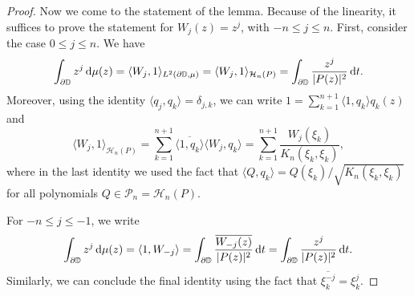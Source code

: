 \documentclass[10pt,a4paper]{amsart}
\def\P{\mathcal{P}}
\renewcommand{\d}{\text{\rm d}}
\newcommand{\dD}{\partial\mathbb{D}}
\begin{document}
\begin{proof}
Now we come to the statement of the lemma. Because of the linearity, it suffices to prove the statement for $W_j(z)=z^j$, with $-n\leq j\leq n$.  First, consider the case $0\leq j\leq n$. We have 
\begin{equation*}
    \int_{\dD} z^j\, \d\mu(z)=\langle W_j, 1\rangle_{L^2(\dD, \mu)}=\langle W_j, 1\rangle_{\mathcal{H}_n(P)}=\int_{\dD}\frac{z^j}{|P(z)|^2}\, \d t.
\end{equation*}
Moreover, using the identity $\langle q_j, q_k\rangle=\delta_{j,k}$, we can write $1=\sum_{k=1}^{n+1} \langle 1, q_k\rangle q_k(z)$ and 
\begin{equation*}
    \langle W_j, 1\rangle_{\mathcal{H}_n(P)}=\sum_{k=1}^{n+1}\overline{\langle 1, q_k\rangle}\langle W_j, q_k\rangle=\sum_{k=1}^{n+1}\frac{W_j(\xi_k)}{K_n(\xi_k, \xi_k)},
\end{equation*}
where in the last identity we used the fact that $\langle Q, q_k\rangle=Q(\xi_k)/\sqrt{K_n(\xi_k, \xi_k)}$ for all polynomials $Q\in \P_n=\mathcal{H}_n(P)$.

For $-n\leq j\leq -1$, we write
\begin{equation*}
    \int_{\dD} z^j\, \d\mu(z)=\langle 1, W_{-j}\rangle=\int_{\dD} \frac{\overline{W_{-j}(z)}}{|P(z)|^2}\,\d t=\int_{\dD}\frac{z^j}{|P(z)|^2}\,\d t.
\end{equation*}
Similarly, we can conclude the final identity using the fact that $\overline{\xi_k^{-j}}=\xi_k^{j}$. 
\end{proof}
\end{document}
